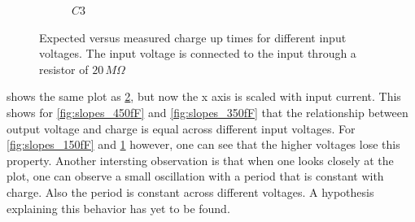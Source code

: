 \begin{figure}[h]
\begin{subfigure}[b]{0.475\textwidth}
                            \caption[]
                                {$C3$}    
                                \label{fig:slopes_50fF}
                        \end{subfigure}
                    \caption{Expected versus measured charge up times for different input voltages. The input voltage is connected to the input through a resistor of $20\,M\Omega$}
                \label{fig:slopes}
        \end{figure}
    
     shows the same plot as \cref{fig:slopes}, but now the x axis is scaled with input current. This shows for \cref{fig:slopes_450fF} and \ref{fig:slopes_350fF} that the relationship between output voltage and charge is equal across different input voltages. For \cref{fig:slopes_150fF} and \ref{fig:slopes_50fF} however, one can see that the higher voltages lose this property. Another intersting observation is that when one looks closely at the plot, one can observe a small oscillation with a period that is constant with charge. Also the period is constant across different voltages. A hypothesis explaining this behavior has yet to be found.


